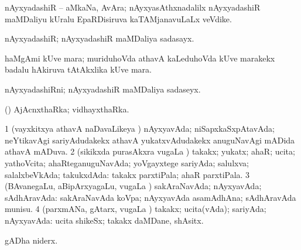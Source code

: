 \bentry
{}
\gl{\nA}
\bmng
nAyxyadashiR -- aMkaNa, AvAra; nAyxyasAthxnadalilx nAyxyadashiR maMDaliyu kUralu EpaRDisiruva kaTAMjanavuLaLx veVdike. 
\emng
\eentry

\bentry
{}
\gl{\nA}
\bmng
nAyxyadashiR; nAyxyadashiR maMDaliya sadasayx. 
\emng
\eentry

\bentry
{}
\gl{\nA}
\bmng
haMgAmi kUve mara; muriduhoVda athavA kaLeduhoVda kUve marakekx badalu hAkiruva tAtAkxlika kUve mara. 
\emng
\eentry

\bentry
{}
\gl{\nA}
\bmng
nAyxyadashiRni; nAyxyadashiR maMDaliya sadaseyx. 
\emng
\eentry

\bentry
{}
\gl{\nA}
\bmng
(\vAyx) AjAcnxthaRka; vidhayxthaRka. 
\emng
\eentry

\bentry
{}
\gl{\gu}
\bmng
\bnum
\num{1} (vayxkitxya athavA naDavaLikeya \vi) nAyxyavAda; niSapxkaSxpAtavAda; neYtikavAgi sariyAdudakekx athavA yukatxvAdudakekx anuguNavAgi mADida athavA mADuva. 
\num{2} (sikikxda purasAkxra \mo vugaLa \vi) takakx; yukatx; ahaR; ucita; yathoVcita; ahaRteganuguNavAda; yoVgayxtege sariyAda; salulxva; salalxbeVkAda; takukxdAda:  takakx parxtiPala; ahaR parxtiPala. 
\num{3} (BAvanegaLu, aBipArxyagaLu, \mo vugaLa \vi) sakAraNavAda; nAyxyavAda; sAdhAravAda:  sakAraNavAda koVpa; nAyxyavAda asamAdhAna; sAdhAravAda munisu. 
\num{4} (parxmANa, gAtarx, \mo vugaLa \vi) takakx; ucita(vAda); sariyAda; nAyxyavAda:  ucita shikeSx; takakx daMDane, shAsitx. 
\enum
\emng

\noindent
\gl{\pagu}
\bmng
{} gADha niderx. 
\emng
\eentry

